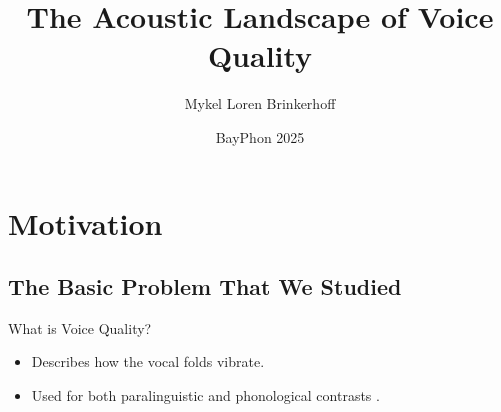 \documentclass{beamer}
\title[Acoustic Landscape] %
{The Acoustic Landscape of Voice Quality}
\author[Brinkerhoff] %
{Mykel Loren Brinkerhoff}
\institute[UC Santa Cruz] %
{University of California, Santa Cruz}
\date[BayPhon 2025] %
{BayPhon 2025}
\begin{document}
\begin{frame}
  \titlepage
\end{frame}





\section{Motivation}
\subsection{The Basic Problem That We Studied}
\begin{frame}{What is Voice Quality?}

  \begin{itemize}
  \item
    Describes how the vocal folds vibrate.
  \item
    Used for both paralinguistic \citep[e.g.,][]{laverVoiceQualityIndexical1968,podesvaStanceWindowLanguageRace2016} and phonological contrasts \citep[e.g.,][]{espositoCrosslinguisticPatternsPhonation2020}.
  \end{itemize}
\end{frame}
\end{document}
